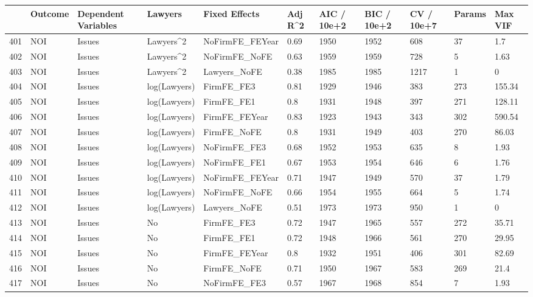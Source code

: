 \begin{table}[ht]
\centering
\begin{tabular}{rllllllllll}
  \hline
 & Outcome & Dependent Variables & Lawyers & Fixed Effects & Adj R^2 & AIC / 10e+2 & BIC / 10e+2 & CV / 10e+7 & Params & Max VIF \\ 
  \hline
401 & NOI & Issues & Lawyers^2 & NoFirmFE\_FEYear & 0.69 & 1950 & 1952 & 608 & 37 & 1.7 \\ 
  402 & NOI & Issues & Lawyers^2 & NoFirmFE\_NoFE & 0.63 & 1959 & 1959 & 728 & 5 & 1.63 \\ 
  403 & NOI & Issues & Lawyers^2 & Lawyers\_NoFE & 0.38 & 1985 & 1985 & 1217 & 1 & 0 \\ 
  404 & NOI & Issues & log(Lawyers) & FirmFE\_FE3 & 0.81 & 1929 & 1946 & 383 & 273 & 155.34 \\ 
  405 & NOI & Issues & log(Lawyers) & FirmFE\_FE1 & 0.8 & 1931 & 1948 & 397 & 271 & 128.11 \\ 
  406 & NOI & Issues & log(Lawyers) & FirmFE\_FEYear & 0.83 & 1923 & 1943 & 343 & 302 & 590.54 \\ 
  407 & NOI & Issues & log(Lawyers) & FirmFE\_NoFE & 0.8 & 1931 & 1949 & 403 & 270 & 86.03 \\ 
  408 & NOI & Issues & log(Lawyers) & NoFirmFE\_FE3 & 0.68 & 1952 & 1953 & 635 & 8 & 1.93 \\ 
  409 & NOI & Issues & log(Lawyers) & NoFirmFE\_FE1 & 0.67 & 1953 & 1954 & 646 & 6 & 1.76 \\ 
  410 & NOI & Issues & log(Lawyers) & NoFirmFE\_FEYear & 0.71 & 1947 & 1949 & 570 & 37 & 1.79 \\ 
  411 & NOI & Issues & log(Lawyers) & NoFirmFE\_NoFE & 0.66 & 1954 & 1955 & 664 & 5 & 1.74 \\ 
  412 & NOI & Issues & log(Lawyers) & Lawyers\_NoFE & 0.51 & 1973 & 1973 & 950 & 1 & 0 \\ 
  413 & NOI & Issues & No & FirmFE\_FE3 & 0.72 & 1947 & 1965 & 557 & 272 & 35.71 \\ 
  414 & NOI & Issues & No & FirmFE\_FE1 & 0.72 & 1948 & 1966 & 561 & 270 & 29.95 \\ 
  415 & NOI & Issues & No & FirmFE\_FEYear & 0.8 & 1932 & 1951 & 406 & 301 & 82.69 \\ 
  416 & NOI & Issues & No & FirmFE\_NoFE & 0.71 & 1950 & 1967 & 583 & 269 & 21.4 \\ 
  417 & NOI & Issues & No & NoFirmFE\_FE3 & 0.57 & 1967 & 1968 & 854 & 7 & 1.93 \\ 

\end{tabular}
\end{table}
